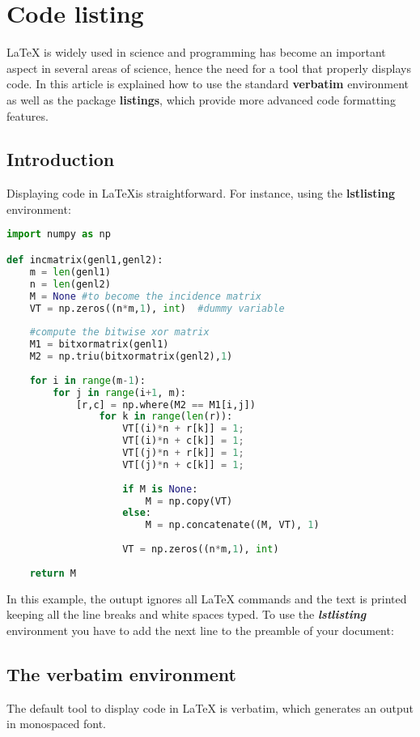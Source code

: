 
\chapter{Code listing}

\LaTeX{} is widely used in science and programming has become an important aspect in several areas of science, hence the need for a tool that properly displays code. In this article is explained how to use the standard \textbf{verbatim} environment as well as the package \textbf{listings}, which provide more advanced code formatting features.

\section{Introduction}
Displaying code in \LaTeX{}is straightforward. For instance, using the \textbf{lstlisting} environment:

\begin{lstlisting}[language=python]
import numpy as np

def incmatrix(genl1,genl2):
	m = len(genl1)
	n = len(genl2)
	M = None #to become the incidence matrix
	VT = np.zeros((n*m,1), int)  #dummy variable
	
	#compute the bitwise xor matrix
	M1 = bitxormatrix(genl1)
	M2 = np.triu(bitxormatrix(genl2),1) 
	
	for i in range(m-1):
		for j in range(i+1, m):
			[r,c] = np.where(M2 == M1[i,j])
				for k in range(len(r)):
					VT[(i)*n + r[k]] = 1;
					VT[(i)*n + c[k]] = 1;
					VT[(j)*n + r[k]] = 1;
					VT[(j)*n + c[k]] = 1;
					
					if M is None:
						M = np.copy(VT)
					else:
						M = np.concatenate((M, VT), 1)
					
					VT = np.zeros((n*m,1), int)
	
	return M
\end{lstlisting}


In this example, the outupt ignores all \LaTeX{} commands and the text is printed keeping all the line breaks and white spaces typed. To use the \textit{\bfseries lstlisting} environment you have to add the next line to the preamble of your document:


\section{The verbatim environment}
The default tool to display code in \LaTeX{} is verbatim, which generates an output in monospaced font.


